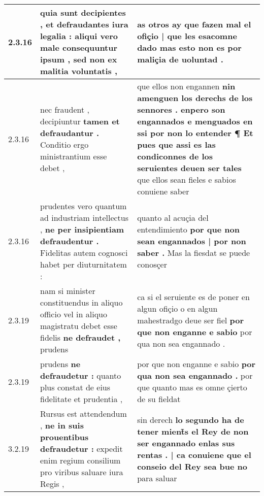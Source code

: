 \begin{tabular}{|p{1cm}|p{6.5cm}|p{6.5cm}|}

\hline
2.3.16 & quia sunt decipientes , \textbf{ et defraudantes iura legalia : aliqui vero male consequuntur ipsum , } sed non ex malitia voluntatis , & as otros ay \textbf{ que fazen mal el ofiçio | que les esacomne dado } mas esto non es por maliçia de uoluntad . \\\hline
2.3.16 & nec fraudent , decipiuntur \textbf{ tamen et defraudantur . } Conditio ergo ministrantium esse debet , & que ellos non engannen \textbf{ nin amenguen los derechs de los sennores . enpero son engannados e menguados en ssi por non lo entender ¶ Et pues que assi es las condiconnes de los seruientes deuen ser tales } que ellos sean fieles e sabios conuiene saber \\\hline
2.3.16 & prudentes vero quantum ad industriam intellectus , \textbf{ ne per insipientiam defraudentur . } Fidelitas autem cognosci habet per diuturnitatem : & quanto al acuçia del entendimiento \textbf{ por que non sean engannados | por non saber . } Mas la fiesdat se puede conosçer \\\hline
2.3.19 & nam si minister constituendus in aliquo officio vel in aliquo magistratu debet esse fidelis \textbf{ ne defraudet , } prudens & ca si el seruiente es de poner en algun ofiçio o en algun mahestradgo deue ser fiel \textbf{ por que non enganne e sabio } por qua non sea engannado . \\\hline
2.3.19 & prudens \textbf{ ne defraudetur : } quanto plus constat de eius fidelitate et prudentia , & por que non enganne e sabio \textbf{ por qua non sea engannado . } por que quanto mas es omne çierto de su fieldat \\\hline
3.2.19 & Rursus est attendendum , \textbf{ ne in suis prouentibus defraudetur : } expedit enim regium consilium pro viribus saluare iura Regis , & sin derech \textbf{ lo segundo ha de tener mient̃s el Rey de non ser engannado enlas sus rentas . | ca conuiene que el conseio del Rey sea bue no } para saluar \\\hline

\end{tabular}
